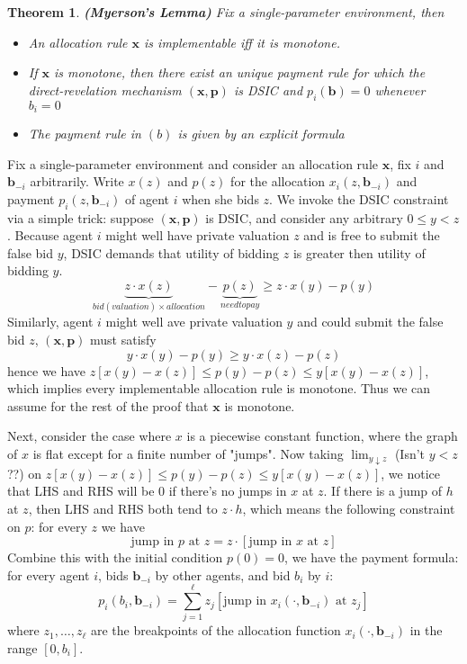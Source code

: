 \documentclass[10pt]{article}
\def\red#1{{\color{red}#1}}
\newtheorem{thm}{Theorem}[section]
\theoremstyle{definition}
\begin{document}
\begin{thm} \textbf{(Myerson's Lemma)} Fix a single-parameter environment, then
	\begin{itemize}
		\item[(a)] An allocation rule $\textbf{x}$ is implementable iff it is monotone.
		\item[(b)] If $\textbf{x}$ is monotone, then there exist an unique payment rule for which the direct-revelation mechanism $(\textbf{x}, \textbf{p})$
		      is DSIC and $p_{i}(\textbf{b}) = 0$ whenever $b_{i} = 0$
		\item[(c)] The payment rule in $(b)$ is given by an explicit formula
	\end{itemize}
\end{thm}
\proof Fix a single-parameter environment and consider an allocation rule $\textbf{x}$, fix $i$ and $\textbf{b}_{-i}$ arbitrarily.
Write $x(z)$ and $p(z)$ for the allocation $x_{i}(z, \textbf{b}_{-i})$ and payment $p_{i}(z, \textbf{b}_{-i})$ of agent $i$ when she bids $z$.
We invoke the DSIC constraint via a simple trick: suppose $(\textbf{x}, \textbf{p})$ is DSIC, and consider any arbitrary $0 \le y < z$.
Because agent $i$ might well have private valuation $z$ and is free to submit the false bid $y$, DSIC demands that utility of bidding $z$ is greater then
utility of bidding $y$.
\begin{equation*}
	\underbrace{z\cdot x(z)}_{bid(valuation) \times allocation} - \underbrace{p(z)}_{need to pay} \ge z \cdot x(y) - p(y)
\end{equation*}
Similarly, agent $i$ might well ave private valuation $y$ and could submit the false bid $z$, $(\textbf{x}, \textbf{p})$ must satisfy
\begin{equation*}
	y \cdot x(y) - p(y) \ge y \cdot x(z) - p(z)
\end{equation*}
hence we have $z[x(y) - x(z)] \le p(y) - p(z) \le y[x(y) - x(z)]$, which implies every implementable allocation rule is monotone.
Thus we can assume for the rest of the proof that $\textbf{x}$ is monotone.

Next, consider the case where $x$ is a piecewise constant function, where the graph of $x$ is flat except for a finite number of "jumps".
Now taking $\lim_{y \downarrow z}$ (\red{Isn't $y < z$??}) on $z[x(y) - x(z)] \le p(y) - p(z) \le y[x(y) - x(z)]$, we notice that LHS and RHS will be 0 if there's no jumps in $x$ at $z$.
If there is a jump of $h$ at $z$, then LHS and RHS both tend to $z \cdot h$, which means the following constraint on $p$: for every $z$ we have
\begin{equation*}
	\text{jump in } p \text{ at } z = z \cdot [\text{jump in } x \text{ at } z]
\end{equation*}
Combine this with the initial condition $p(0) = 0$, we have the payment formula: for every agent $i$, bids $\textbf{b}_{-i}$ by other agents, and bid $b_{i}$ by $i$:
\begin{equation*}
	p_{i}(b_{i}, \textbf{b}_{-i}) = \sum_{j=1}^{\ell}z_{j}[\text{jump in } x_{i}(\cdot, \textbf{b}_{-i}) \text{ at } z_{j}]
\end{equation*}
where $z_1, \dots, z_{\ell}$ are the breakpoints of the allocation function $x_{i}(\cdot, \textbf{b}_{-i})$ in the range $[0, b_i]$.
\end{document}
